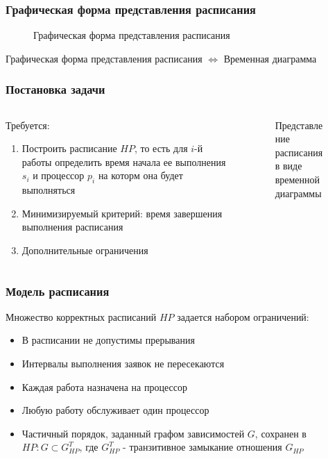 \begin{frame}
    \frametitle{Графическая форма представления расписания}
    \begin{figure}
        \small
        \captionsetup{labelformat=empty}
        \caption{\small Графическая форма представления расписания}
    \end{figure}
    Графическая форма представления расписания $\Leftrightarrow$ Временная диаграмма
\end{frame}

\begin{frame}
    \frametitle{Постановка задачи}
    \begin{columns}
        \begin{column}{0.6\textwidth}
            Требуется:
            \begin{enumerate}
                \item Построить расписание $HP$, то есть для $i$-й работы определить время начала ее выполнения $s_i$ и процессор $p_i$ на которм она будет выполняться
                \item Минимизируемый критерий: время завершения выполнения расписания
                \item Дополнительные ограничения
            \end{enumerate}
        \end{column}
        \begin{column}{0.4\textwidth}
            \begin{figure}
                \tiny
                \captionsetup{labelformat=empty}
                \caption{\small Представление расписания в виде временной диаграммы}
            \end{figure}
        \end{column}
    \end{columns}
\end{frame}

\begin{frame}
    \frametitle{Модель расписания}
    Множество корректных расписаний $HP$ задается набором ограничений:
    \begin{itemize}
        \item В расписании не допустимы прерывания
        \item Интервалы выполнения заявок не пересекаются
        \item Каждая работа назначена на процессор
        \item Любую работу обслуживает один процессор
        \item Частичный порядок, заданный графом зависимостей $G$, сохранен в $HP: G \subset G_{HP}^T$, где $G_{HP}^T$ - транзитивное замыкание отношения $G_{HP}$
    \end{itemize}
\end{frame}

